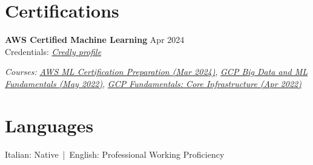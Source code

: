 \documentclass[11pt,a4paper]{article}
\let\OldHref\href
\renewcommand{\href}[2]{\OldHref{#1}{\textit{#2}}}
\begin{document}
    \section*{Certifications}
    {\small
        \textbf{AWS Certified Machine Learning} \hfill Apr 2024 \\
        Credentials: \href{https://www.credly.com/badges/ab41e8bd-32a3-49ce-a7a5-e3106f58beab/public_url}{Credly profile}
        
        \textit{Courses: }%
        \href{https://certificates.cloudacademy.com/8997053f1d2091596d528402607d41ca312060fc.pdf}{AWS ML Certification Preparation (Mar 2024)}, %
        \href{https://www.coursera.org/account/accomplishments/verify/KFC43YVQX5ZS}{GCP Big Data and ML Fundamentals (May 2022)}, %
        \href{https://www.coursera.org/account/accomplishments/verify/GCCEPUHES7UC}{GCP Fundamentals: Core Infrastructure (Apr 2022)}
    }
    
    \section*{Languages}
    Italian: Native \,|\, English: Professional Working Proficiency
    
\end{document}
